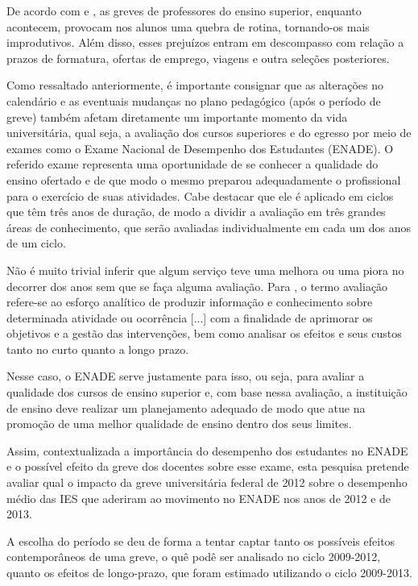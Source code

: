 De acordo com  e , as greves de professores do ensino superior, enquanto acontecem, provocam nos alunos uma quebra de rotina, tornando-os mais improdutivos. Além disso, esses prejuízos entram em descompasso com relação a prazos de formatura, ofertas de emprego, viagens e outra seleções posteriores.

Como ressaltado anteriormente, é importante consignar que as alterações no calendário e as eventuais mudanças no plano pedagógico (após o período de greve) também afetam diretamente um importante momento da vida universitária, qual seja, a avaliação dos cursos superiores e do egresso por meio de exames como o Exame Nacional de Desempenho dos Estudantes (ENADE). O referido exame representa uma oportunidade de se conhecer a qualidade do ensino ofertado e de que modo o mesmo preparou adequadamente o profissional para o exercício de suas atividades. Cabe destacar que ele é aplicado em ciclos que têm três anos de duração, de modo a dividir a avaliação em três grandes áreas de conhecimento, que serão avaliadas individualmente em cada um dos anos de um ciclo.

Não é muito trivial inferir que algum serviço teve uma melhora ou uma piora no decorrer dos anos sem que se faça alguma avaliação. Para , o termo avaliação refere-se ao esforço analítico de produzir informação e conhecimento sobre determinada atividade ou ocorrência [...] com a finalidade de aprimorar os objetivos e a gestão das intervenções, bem como analisar os efeitos e seus custos tanto no curto quanto a longo prazo.

Nesse caso, o ENADE serve justamente para isso, ou seja, para avaliar a qualidade dos cursos de ensino superior e, com base nessa avaliação, a instituição de ensino deve realizar um planejamento adequado de modo que atue na promoção de uma melhor qualidade de ensino dentro dos seus limites.

Assim, contextualizada a importância do desempenho dos estudantes no ENADE e o possível efeito da greve dos docentes sobre esse exame, esta pesquisa pretende avaliar qual o impacto da greve universitária federal de 2012 sobre o desempenho médio das IES que aderiram ao movimento no ENADE nos anos de 2012 e de 2013.

A escolha do período se deu de forma a tentar captar tanto os possíveis efeitos contemporâneos de uma greve, o quê podê ser analisado no ciclo 2009-2012, quanto os efeitos de longo-prazo, que foram estimado utilizando o ciclo 2009-2013.

